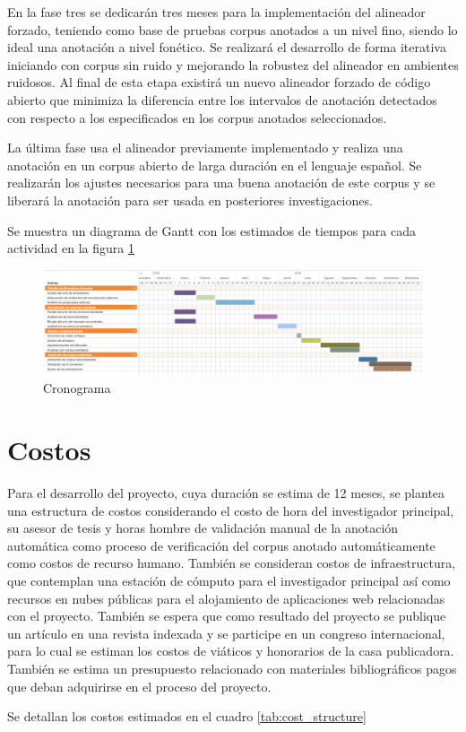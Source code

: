 En la fase tres se dedicarán tres meses para la implementación del alineador forzado, teniendo como base de pruebas corpus anotados a un nivel fino, siendo lo ideal una anotación a nivel fonético. Se realizará el desarrollo de forma iterativa iniciando con corpus sin ruido y mejorando la robustez del alineador en ambientes ruidosos. Al final de esta etapa existirá un nuevo alineador forzado de código abierto que minimiza la diferencia entre los intervalos de anotación detectados con respecto a los especificados en los corpus anotados seleccionados.

La última fase usa el alineador previamente implementado y realiza una anotación en un corpus abierto de larga duración en el lenguaje español. Se realizarán los ajustes necesarios para una buena anotación de este corpus y se liberará la anotación para ser usada en posteriores investigaciones.

Se muestra un diagrama de Gantt con los estimados de tiempos para cada actividad en la figura \ref{img:schedule}

\begin{landscape}
\begin{figure}[H]

\centering
\caption{Cronograma}
\label{img:schedule}
\includegraphics[scale=0.40]{images/schedule.png}

\end{figure}
\end{landscape}


\section{Costos}

Para el desarrollo del proyecto, cuya duración se estima de 12 meses, se plantea una estructura de costos considerando el costo de hora del investigador principal, su asesor de tesis y horas hombre de validación manual de la anotación automática como proceso de verificación del corpus anotado automáticamente como costos de recurso humano. También se consideran costos de infraestructura, que contemplan una estación de cómputo para el investigador principal así como recursos en nubes públicas para el alojamiento de aplicaciones web relacionadas con el proyecto. También se espera que como resultado del proyecto se publique un artículo en una revista indexada y se participe en un congreso internacional, para lo cual se estiman los costos de viáticos y honorarios de la casa publicadora. También se estima un presupuesto relacionado con materiales bibliográficos pagos que deban adquirirse en el proceso del proyecto. 

Se detallan los costos estimados en el cuadro \ref{tab:cost_structure}



